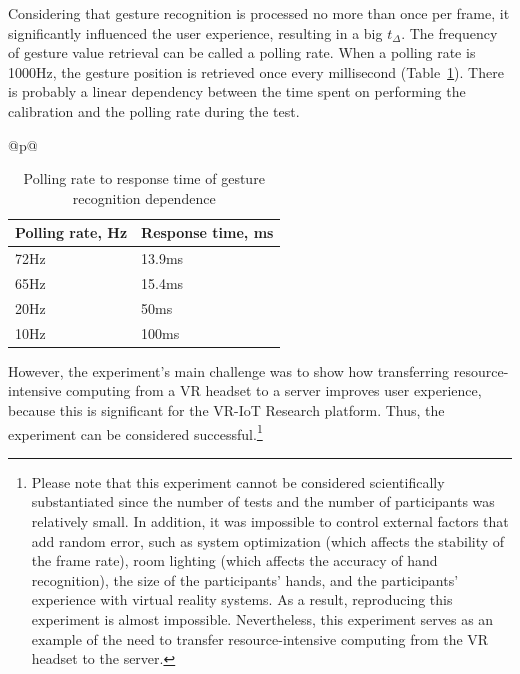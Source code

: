 Considering that gesture recognition is processed no more than once per frame, it significantly influenced the user experience, resulting in a big $t_{\Delta}$. The frequency of gesture value retrieval can be called a polling rate. When a polling rate is 1000Hz, the gesture position is retrieved once every millisecond (Table~\ref{tab:polling-rate-table}). There is probably a linear dependency between the time spent on performing the calibration and the polling rate during the test.

\begin{table}
\let\TPToverlap=\TPTrlap
  \centering
  \begin{threeparttable}[c]
    \caption{Polling rate to response time of gesture recognition dependence}
    \label{tab:polling-rate-table}
    \begin{tabular}{@{}p{\textwidth}@{}}
    \centering
    \begin{tabular}{ll}
      \toprule
      Polling rate, Hz    & Response time, ms                 \\
      \midrule
      72Hz & 13.9ms \\
      65Hz & 15.4ms \\
      20Hz & 50ms \\
      10Hz & 100ms \\
      \bottomrule
    \end{tabular}
    \end{tabular}
  \end{threeparttable}
\end{table}

However, the experiment's main challenge was to show how transferring resource-intensive computing from a VR headset to a server improves user experience, because this is significant for the VR-IoT Research platform. Thus, the experiment can be considered successful.\footnote{Please note that this experiment cannot be considered scientifically substantiated since the number of tests and the number of participants was relatively small. In addition, it was impossible to control external factors that add random error, such as system optimization (which affects the stability of the frame rate), room lighting (which affects the accuracy of hand recognition), the size of the participants' hands, and the participants' experience with virtual reality systems. As a result, reproducing this experiment is almost impossible. Nevertheless, this experiment serves as an example of the need to transfer resource-intensive computing from the VR headset to the server.
}


